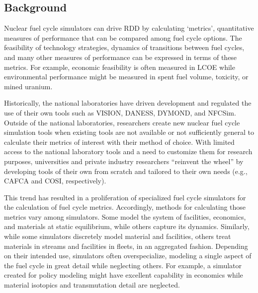 \subsection{Background}



Nuclear fuel cycle simulators can drive \gls{RDD} by calculating `metrics', 
quantitative measures of performance that 
can be compared among fuel cycle options. The feasibility of technology 
strategies, dynamics of transitions between fuel cycles, and many other 
measures of performance can be expressed in terms of these metrics. For example, 
economic feasibility is often measured in \gls{LCOE}
while environmental performance might be measured in spent fuel volume, 
  toxicity, or mined uranium.

Historically, the national laboratories have driven development and regulated 
the use of their own tools such as \gls{VISION}\cite{jacobson_verifiable_2010}, 
\gls{DANESS}\cite{van_den_durpel_daness_2009}, 
\gls{DYMOND}\cite{yacout_modeling_2005}, and 
\gls{NFCSim}\cite{schneider_nfcsim:_2005}. 
Outside of the national laboratories, researchers create new nuclear fuel cycle 
simulation tools when existing tools are not available or not sufficiently 
general to calculate their metrics of interest with their method of choice.  
With limited access to the national laboratory tools and a need to customize 
them for research purposes, universities and private industry researchers 
``reinvent the wheel'' by developing tools of their own from scratch and 
tailored to their own needs (e.g., \gls{CAFCA}\cite{guerin_impact_2009} and 
\gls{COSI}\cite{boucher_cosi_2005,boucher_cosi:_2006,meyer_new_2009,coquelet-pascal_comparison_2011}, respectively). 

This trend has resulted in a proliferation of specialized
fuel cycle simulators for the calculation of fuel cycle metrics.  Accordingly, methods 
for calculating those metrics vary among simulators. Some model the 
system of facilities, economics, and materials at static equilibrium, while 
others capture its dynamics.  
Similarly, while some simulators discretely model material and facilities, 
others treat materials in streams and facilities in fleets, in an aggregated 
fashion. Depending on their intended use, simulators often overspecialize, 
modeling a single aspect of the fuel cycle in great detail while neglecting 
others. For example, a simulator created for policy modeling might have excellent 
capability in economics while material isotopics and transmutation detail are 
neglected.

